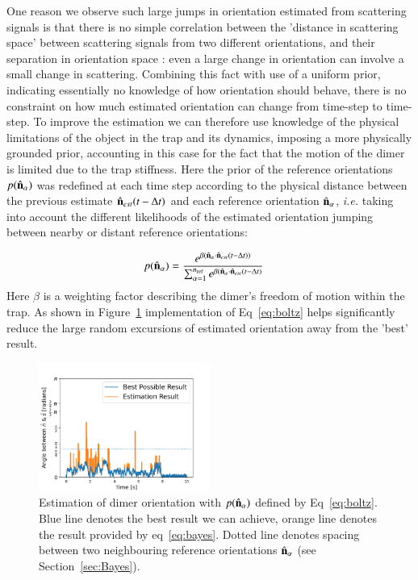 \documentclass[final,  3p]{elsarticle}
\begin{document}
One reason we observe such large jumps in  orientation estimated from scattering signals is that there is no simple correlation between the 'distance in scattering space' between scattering signals from two different orientations, and their separation in orientation space : even a large change in orientation can involve a small change in scattering. Combining this fact with use of a uniform prior, indicating essentially no knowledge of how orientation should behave, there is no constraint on how much estimated orientation can change from time-step to time-step. To improve the estimation we can therefore use knowledge of the physical limitations of the object in the trap and its dynamics, imposing a more physically grounded prior,  accounting in this case for the fact that the motion of the dimer is limited due to the trap stiffness. Here the prior of the reference orientations $p(\hat{\bf n}_\alpha)$ was redefined at each time step according to the physical distance between the previous estimate $\hat{\bf n}_{est}(t-\Delta t)$ and each reference orientation $\hat{\bf n}_\alpha$, \textit{i.e.} taking into account the different likelihoods of the estimated orientation jumping between nearby or distant reference orientations:

\begin{align}
  p(\hat{\bf n}_\alpha)
  &=\frac{e^{\beta (\hat{\bf n}_\alpha 
  	\cdot \hat{\bf n}_{est}(t-\Delta t))}}
  {\sum_{\alpha=1}^{n_{\rm ref}}
	e^{\beta (\hat{\bf n}_\alpha 
	\cdot \hat{\bf n}_{est}(t-\Delta t)}}
	\label{eq:boltz}
\end{align}
Here $\beta$ is a weighting factor describing the dimer's freedom of motion within the trap. As shown in Figure~\ref{fig:biased} implementation of Eq~\eqref{eq:boltz} helps significantly reduce the large random excursions of estimated orientation away from the 'best' result. 

\begin{figure}[h]
\centering
\includegraphics[width=0.5\textwidth]{./Images/fig4.png}
\caption{\label{fig:biased}
%
Estimation of dimer orientation with $p(\hat{\bf n}_\alpha)$ defined
by Eq~\eqref{eq:boltz}.  Blue line denotes the best result we can
achieve, orange line denotes the result provided by eq~\ref{eq:bayes}.
Dotted line denotes spacing between two neighbouring reference
orientations $\hat{\bf n}_\alpha$ (see Section~\ref{sec:Bayes}).
}
\end{figure} 
 
\end{document}
